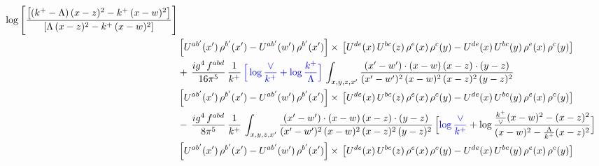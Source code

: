 \documentclass[9pt]{article}
\numberwithin{equation}{section}
\begin{document}
\begin{align}
\log{\left[\frac{\left[(k^{+}-\Lambda)\, (x-z)^{2} - k^{+}\, (x-w)^{2}\right]}{\left[\Lambda\, (x-z)^{2} - k^{+}\, (x-w)^{2}\right]}\right]}\notag \\ & \left[U^{ab'}(x')\,\rho^{b'}(x')-U^{ab'}(w')\, \rho^{b'}(x')\right]\times\, \left[U^{de}(x)\,U^{bc}(z)\, \rho^{e}(x)\,\rho^{c}(y)-U^{de}(x)\,U^{bc}(y)\,\rho^{e}(x)\,\rho^{c}(y)\right]\notag \\ & +\, \frac{ig^{4}\,f^{abd}}{16\pi^{5}}\,\frac{1}{k^{+}}\,{\color{blue}\Big[\log\frac{\vee}{k^{+}}+\log\frac{k^{+}}{\Lambda}\Big]}\,\int_{x,y,z,x'} \frac{(x'-w')\cdot (x-w)\, (x-z)\cdot (y-z)}{(x'-w')^{2}\, (x-w)^{2}\, (x-z)^{2}\, (y-z)^{2}}\, \notag \\ & \left[U^{ab'}(x')\,\rho^{b'}(x')-U^{ab'}(w')\, \rho^{b'}(x')\right]\times\, \left[U^{de}(x)\,U^{bc}(z)\, \rho^{e}(x)\,\rho^{c}(y)-U^{de}(x)\,U^{bc}(y)\,\rho^{e}(x)\,\rho^{c}(y)\right]\notag \\ &-\, \frac{ig^{4}\,f^{abd}}{8\pi^{5}}\,\frac{1}{k^{+}}\,\int_{x,y,z,x'}\frac{(x'-w')\cdot (x-w)\, (x-z)\cdot (y-z)}{(x'-w')^{2}\, (x-w)^{2}\, (x-z)^{2}\, (y-z)^{2}}\,\Big[{\color{blue}\log\frac{\vee}{k^{+}}}+\log\frac{\frac{k^{+}}{\vee}(x-w)^{2}-(x-z)^{2}}{(x-w)^{2}-\frac{\Lambda}{k^{+}}(x-z)^{2}}\Big] \notag \\ & \left[U^{ab'}(x')\,\rho^{b'}(x')-U^{ab'}(w')\, \rho^{b'}(x')\right]\times\, \left[U^{de}(x)\,U^{bc}(z)\, \rho^{e}(x)\,\rho^{c}(y)-U^{de}(x)\,U^{bc}(y)\,\rho^{e}(x)\,\rho^{c}(y)\right]
\end{align}
\end{document}
